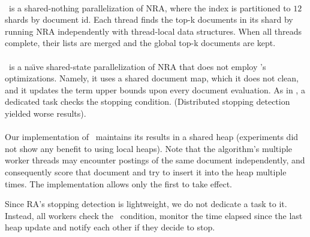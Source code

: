 {\paragraph{\sNRA}
\sNRA\ is a shared-nothing parallelization of NRA, where the index is partitioned to $12$ shards by document id. 
Each thread finds the top-k documents in its shard by running NRA independently with thread-local data structures. 
When all threads complete, their lists are merged and the global top-k documents are kept.  

\paragraph{\pNRA}
\pNRA\ is a na\"{\i}ve shared-state parallelization of NRA that does not employ \alg's optimizations. 
Namely, it uses a shared document map, which it does not clean, and it updates the term
upper bounds upon every document evaluation. As in \alg, a dedicated task checks the stopping condition.
(Distributed stopping detection yielded worse results).


\paragraph{\pRA}
Our implementation of \pRA\ maintains its results in a shared heap (experiments did not show any benefit to using local heaps).
Note that the algorithm's multiple worker threads may encounter postings of the same document independently, 
and consequently score that document and try to insert it into the heap multiple times. The implementation 
allows only the first to take effect.

Since RA's stopping detection is lightweight, we do not dedicate a task to it. Instead, all workers check the  
\RAStop\ condition, monitor the time elapsed since the last heap update and notify each other if they 
decide to stop.



}
